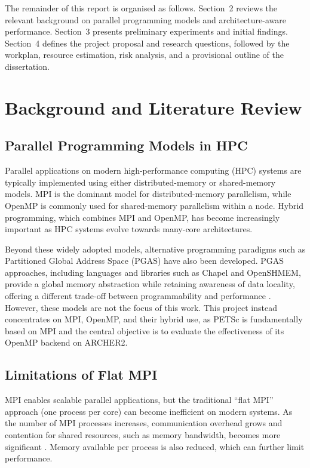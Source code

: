 \documentclass{article}
\begin{document}
The remainder of this report is organised as follows. 
Section~2 reviews the relevant background on parallel programming models and architecture-aware performance. 
Section~3 presents preliminary experiments and initial findings. 
Section~4 defines the project proposal and research questions, followed by the workplan, resource estimation, risk analysis, and a provisional outline of the dissertation.

\section{Background and Literature Review}

\subsection{Parallel Programming Models in HPC}

Parallel applications on modern high-performance computing (HPC) systems are typically implemented using either distributed-memory or shared-memory models. 
MPI is the dominant model for distributed-memory parallelism, while OpenMP is commonly used for shared-memory parallelism within a node. 
Hybrid programming, which combines MPI and OpenMP, has become increasingly important as HPC systems evolve towards many-core architectures.

Beyond these widely adopted models, alternative programming paradigms such as Partitioned Global Address Space (PGAS) have also been developed. 
PGAS approaches, including languages and libraries such as Chapel and OpenSHMEM, provide a global memory abstraction while retaining awareness of data locality, offering a different trade-off between programmability and performance \cite{chapel,openshmem}. 
However, these models are not the focus of this work. 
This project instead concentrates on MPI, OpenMP, and their hybrid use, as PETSc is fundamentally based on MPI and the central objective is to evaluate the effectiveness of its OpenMP backend on ARCHER2.
\subsection{Limitations of Flat MPI}

MPI enables scalable parallel applications, but the traditional ``flat MPI'' approach (one process per core) can become inefficient on modern systems. 
As the number of MPI processes increases, communication overhead grows and contention for shared resources, such as memory bandwidth, becomes more significant \cite{judge2022mpiopenmp}. 
Memory available per process is also reduced, which can further limit performance.
\end{document}
